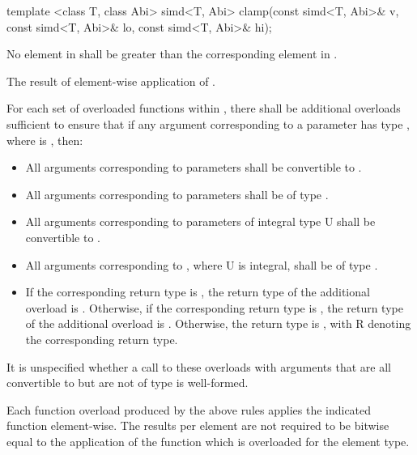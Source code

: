 \begin{itemdecl}
template <class T, class Abi>
simd<T, Abi> clamp(const simd<T, Abi>& v, const simd<T, Abi>& lo, const simd<T, Abi>& hi);
\end{itemdecl}
\begin{itemdescr}
  \pnum\requires No element in  shall be greater than the corresponding element in .

  \pnum\returns The result of element-wise application of  \foralli.
\end{itemdescr}

%

\pnum \label{cl:cmath-spec} For each set of overloaded functions within , there shall be additional overloads sufficient to ensure that if any argument corresponding to a \double parameter has type \simd[<T, Abi>], where  is \true, then:
\begin{itemize}
  \item All arguments corresponding to \double parameters shall be convertible to \simd[<T, Abi>].

  \item All arguments corresponding to  parameters shall be of type \simd[<T, Abi>*].

  \item All arguments corresponding to parameters of integral type \type U shall be convertible to .

  \item All arguments corresponding to , where \type U is integral, shall be of type .

  \item If the corresponding return type is \double, the return type of the additional overload is \simd[<T, Abi>].
    Otherwise, if the corresponding return type is \bool, the return type of the additional overload is \mask[<T, Abi>].
    Otherwise, the return type is , with \type R denoting the corresponding return type.
\end{itemize}
It is unspecified whether a call to these overloads with arguments that are all convertible to \simd[<T, Abi>] but are not of type \simd[<T, Abi>] is well-formed.

\pnum Each function overload produced by the above rules applies the indicated  function element-wise.
The results per element are not required to be bitwise equal to the application of the function which is overloaded for the element type.

